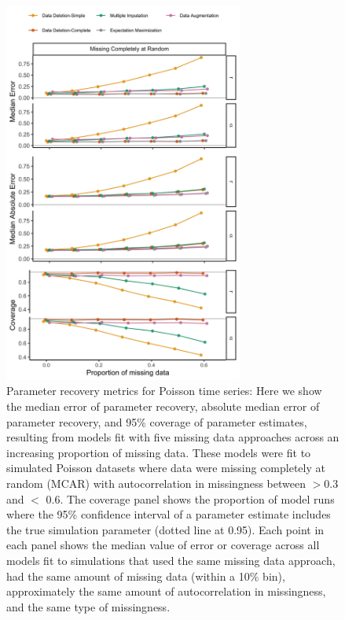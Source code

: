 \documentclass{article}
\begin{document}
\begin{figure}
    \centering
    \noindent\includegraphics[width = 0.7\textwidth]{Figures/MockedUpFigures/parameterRecoveryPoisson_MCARlong.png}
    \caption{Parameter recovery metrics for Poisson time series: Here we show the median error of parameter recovery, absolute median error of parameter recovery, and 95\% coverage of parameter estimates, resulting from models fit with five missing data approaches across an increasing proportion of missing data. These models were fit to simulated Poisson datasets where data were missing completely at random (MCAR) with autocorrelation in missingness between $>$0.3 and $<$ 0.6. The coverage panel shows the proportion of model runs where the 95\% confidence interval of a parameter estimate includes the true simulation parameter (dotted line at 0.95). Each point in each panel shows the median value of error or coverage across all models fit to simulations that used the same missing data approach, had the same amount of missing data (within a 10\% bin), approximately the same amount of autocorrelation in missingness, and the same type of missingness.}
    \label{fig:ParamRec_Pois}
\end{figure}
\end{document}
